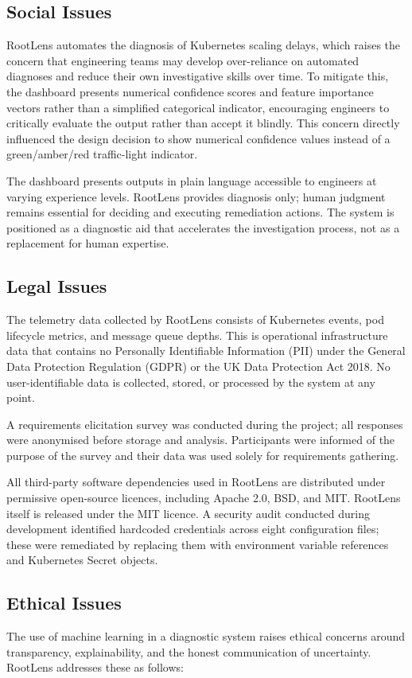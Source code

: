 \subsection{Social Issues}
RootLens automates the diagnosis of Kubernetes scaling delays, which raises the concern that engineering teams may develop over-reliance on automated diagnoses and reduce their own investigative skills over time. To mitigate this, the dashboard presents numerical confidence scores and feature importance vectors rather than a simplified categorical indicator, encouraging engineers to critically evaluate the output rather than accept it blindly. This concern directly influenced the design decision to show numerical confidence values instead of a green/amber/red traffic-light indicator.

The dashboard presents outputs in plain language accessible to engineers at varying experience levels. RootLens provides diagnosis only; human judgment remains essential for deciding and executing remediation actions. The system is positioned as a diagnostic aid that accelerates the investigation process, not as a replacement for human expertise.

\subsection{Legal Issues}
The telemetry data collected by RootLens consists of Kubernetes events, pod lifecycle metrics, and message queue depths. This is operational infrastructure data that contains no Personally Identifiable Information (PII) under the General Data Protection Regulation (GDPR) or the UK Data Protection Act 2018. No user-identifiable data is collected, stored, or processed by the system at any point.

A requirements elicitation survey was conducted during the project; all responses were anonymised before storage and analysis. Participants were informed of the purpose of the survey and their data was used solely for requirements gathering.

All third-party software dependencies used in RootLens are distributed under permissive open-source licences, including Apache 2.0, BSD, and MIT. RootLens itself is released under the MIT licence. A security audit conducted during development identified hardcoded credentials across eight configuration files; these were remediated by replacing them with environment variable references and Kubernetes Secret objects.

\subsection{Ethical Issues}
The use of machine learning in a diagnostic system raises ethical concerns around transparency, explainability, and the honest communication of uncertainty. RootLens addresses these as follows:

